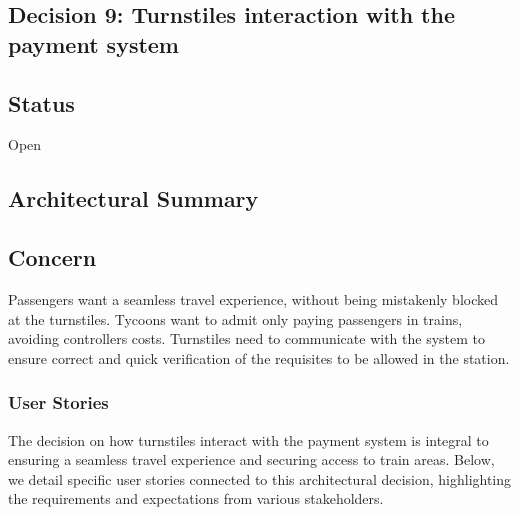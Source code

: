 \subsection{Decision 9: Turnstiles interaction with the payment system}

\subsection*{Status}
Open
\subsection*{Architectural Summary}


\subsection*{Concern}
Passengers want a seamless travel experience, without being mistakenly blocked at the turnstiles.
Tycoons want to admit only paying passengers in trains, avoiding controllers costs.
Turnstiles need to communicate with the system to ensure correct and quick verification of the requisites to be allowed in the station.

\subsubsection{User Stories}
The decision on how turnstiles interact with the payment system is integral to ensuring a seamless travel experience and securing access to train areas. Below, we detail specific user stories connected to this architectural decision, highlighting the requirements and expectations from various stakeholders.


